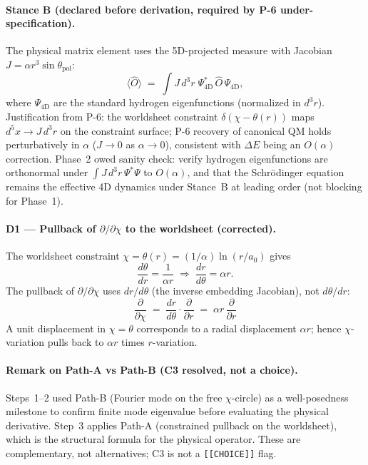 \documentclass[11pt]{article}
\begin{document}
\paragraph{Stance B (declared before derivation, required by P-6 under-specification).}
The physical matrix element uses the 5D-projected measure with Jacobian
$J = \alpha r^3\sin\theta_{\mathrm{pol}}$:
\begin{equation}
  \langle \hat{O}\rangle
  \;=\; \int J\,d^3r\;\Psi_{4\mathrm{D}}^*\,\hat{O}\,\Psi_{4\mathrm{D}},
  \tag{3.0}
\end{equation}
where $\Psi_{4\mathrm{D}}$ are the standard hydrogen eigenfunctions (normalized in
$d^3r$). Justification from P-6: the worldsheet constraint
$\delta(\chi-\theta(r))$ maps $d^5x\!\to\!J\,d^3r$ on the constraint surface;
P-6 recovery of canonical QM holds perturbatively in $\alpha$
($J\!\to\!0$ as $\alpha\!\to\!0$), consistent with $\Delta E$ being an
$O(\alpha)$ correction.
Phase~2 owed sanity check: verify hydrogen eigenfunctions are orthonormal under
$\int J\,d^3r\,\Psi^*\Psi$ to $O(\alpha)$, and that the Schr\"odinger equation
remains the effective 4D dynamics under Stance~B at leading order (not blocking for Phase~1).

\paragraph{D1 --- Pullback of $\partial/\partial\chi$ to the worldsheet (corrected).}
The worldsheet constraint $\chi = \theta(r) = (1/\alpha)\ln(r/a_0)$ gives
\begin{equation}
  \frac{d\theta}{dr} = \frac{1}{\alpha r}
  \;\Longrightarrow\;
  \frac{dr}{d\theta} = \alpha r.
  \tag{3.1a}
\end{equation}
The pullback of $\partial/\partial\chi$ uses $dr/d\theta$ (the inverse embedding
Jacobian), not $d\theta/dr$:
\begin{equation}
  \boxed{\frac{\partial}{\partial\chi}
  \;=\; \frac{dr}{d\theta}\cdot\frac{\partial}{\partial r}
  \;=\; \alpha r\,\frac{\partial}{\partial r}}
  \tag{3.1}
\end{equation}
A unit displacement in $\chi=\theta$ corresponds to a radial displacement $\alpha r$;
hence $\chi$-variation pulls back to $\alpha r$ times $r$-variation.

\paragraph{Remark on Path-A vs Path-B (C3 resolved, not a choice).}
Steps~1--2 used Path-B (Fourier mode on the free $\chi$-circle) as a
well-posedness milestone to confirm finite mode eigenvalue before evaluating
the physical derivative. Step~3 applies Path-A (constrained pullback on the
worldsheet), which is the structural formula for the physical operator.
These are complementary, not alternatives; C3 is not a \texttt{[[CHOICE]]} flag.
\end{document}
